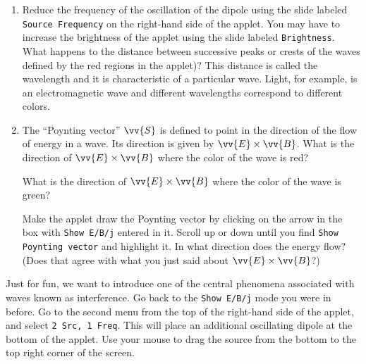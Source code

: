 \begin{enumerate}
\item Reduce the frequency of the oscillation of the dipole using the slide labeled
\texttt{Source Frequency} on the right-hand side of the applet.
You may have to increase the brightness of the applet using the slide labeled
\texttt{Brightness}.
What happens to the distance between successive peaks or crests of the waves defined by the red regions in the
applet)?
This distance is called the wavelength and it is characteristic of a particular
wave.
Light, for example,  is an electromagnetic wave and different wavelengths correspond 
to different colors.
\vspace{2.0cm}


\item The ``Poynting vector'' $\vv{S}$ is defined to point in the direction of the flow of energy in a wave. Its direction is given by $\vv {E} \times \vv {B}$.  What is the direction of $\vv {E}\times \vv {B}$ where the color of the wave is red?
\vspace{1.0cm}

What is the direction of $\vv {E} \times \vv {B}$ where the color of the wave is green?
\vspace{1.0cm}

Make the applet draw the Poynting vector by clicking on the arrow in the box with 
\texttt{Show E/B/j} entered in it. Scroll up or down until you find
\texttt{Show Poynting vector} and highlight it.
In what direction does the energy flow?  (Does that agree with what you just said about $\vv {E} \times \vv {B}$?)
\answerspace{1.0cm}
\end{enumerate}

Just for fun, we want to introduce one of the central phenomena associated
with waves known as interference.
Go back to the \texttt{Show E/B/j} mode you were in before. 
Go to the second menu from the top of the right-hand side of the applet, and select
\texttt{2 Src, 1 Freq}.
This will place an additional oscillating dipole at the bottom of the applet.  Use your mouse to drag the source from the bottom to the top right corner of the screen.

